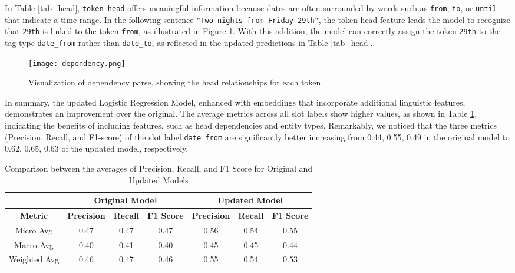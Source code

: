 \documentclass[11pt,a4paper]{article}
\begin{document}
In Table \ref{tab_head}, \texttt{token head} offers meaningful information because dates are often surrounded by words such as \texttt{from}, \texttt{to}, or \texttt{until} that indicate a time range. In the following sentence \texttt{"Two nights from Friday 29th"}, the token head feature leads the model to recognize that \texttt{29th} is linked to the token \texttt{from}, as illustrated in Figure \ref{fig:heads}. With this addition, the model can correctly assign the token \texttt{29th} to the tag type \texttt{date\_from} rather than \texttt{date\_to}, as reflected in the updated predictions in Table \ref{tab_head}.

\begin{figure}[H]
    \centering
    \texttt{[image: dependency.png]}
    \caption{Visualization of dependency parse, showing the head relationships for each token.}
    \label{fig:heads}
\end{figure}

In summary, the updated Logistic Regression Model, enhanced with embeddings that incorporate additional linguistic features, demonstrates an improvement over the original. The average metrics across all slot labels show higher values, as shown in Table \ref{tab_overall_avg}, indicating the benefits of including features, such as head dependencies and entity types. Remarkably, we noticed that the three metrics (Precision, Recall, and F1-score) of the slot label \texttt{date\_from} are significantly better increasing from 0.44, 0.55, 0.49 in the original model to 0.62, 0.65, 0.63 of the updated model, respectively.

\begin{table}[h!]     \centering     \begin{tabular}{|c|c|c|c|c|c|c|}         \hline         & \multicolumn{3}{|c|}{\textbf{Original Model}} & \multicolumn{3}{|c|}{\textbf{Updated Model}} \\         \hline         \textbf{Metric} & \textbf{Precision} & \textbf{Recall} & \textbf{F1 Score} & \textbf{Precision} & \textbf{Recall} & \textbf{F1 Score} \\         \hline         Micro Avg & 0.47 & 0.47 & 0.47 & 0.56 & 0.54 & 0.55 \\                  Macro Avg & 0.40 & 0.41 & 0.40 & 0.45 & 0.45 & 0.44 \\                 Weighted Avg & 0.46 & 0.47 & 0.46 & 0.55 & 0.54 & 0.53 \\         \hline     \end{tabular}     \caption{Comparison between the averages of Precision, Recall, and F1 Score for Original and Updated Models}
\label{tab_overall_avg}
\end{table}
\end{document}
